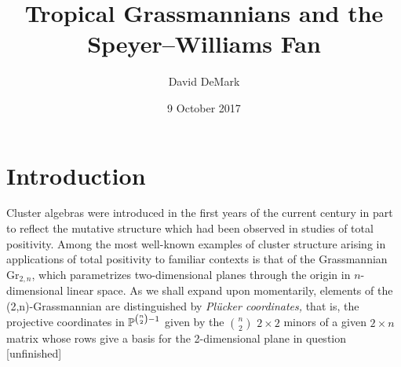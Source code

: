 \documentclass[12pt,letter]{article}
\title{Tropical Grassmannians and the Speyer--Williams Fan}
\date{9 October 2017}
\author{David DeMark}
\newcommand{\gr}{\mathrm{Gr}}
\begin{document}
\maketitle
\setcounter{section}{-1}
\section{Introduction} Cluster algebras were introduced in the first years of the current century in part to reflect the mutative structure which had been observed in studies of total positivity. 
Among the most well-known examples of cluster structure arising in applications of total positivity to familiar contexts is that of the Grassmannian $\gr_{2,n}$, which parametrizes two-dimensional planes through the origin in $n$-dimensional linear space. As we shall expand upon momentarily,  elements of the (2,n)-Grassmannian are distinguished by \emph{Pl\"ucker coordinates,} that is, the projective coordinates in ${\mathbb P}^{{n \choose 2}-1}$ given by the $n \choose 2$ $2\times 2$ minors of a given $2\times n$ matrix whose rows give a basis for the 2-dimensional plane in question [unfinished]
\end{document}
